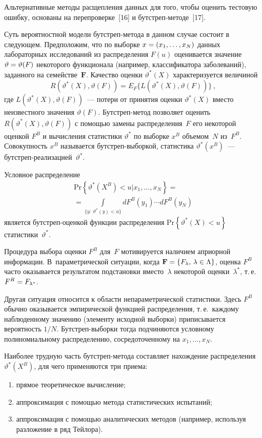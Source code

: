 \begin{multicols}{2}
      Альтернативные методы расщепления данных для того, чтобы оценить тестовую 
ошибку, основаны на перепроверке~[16] и бут\-стреп-ме\-то\-де~[17].
     
     Суть вероятностной модели бутстреп-метода в данном случае состоит в следующем. 
Предположим, что по выборке $x\hm=(x_1,\ldots ,x_N)$ данных лабораторных исследований 
из распределения $F(u)$ оценивается значение $\vartheta\hm=\vartheta(F)$ некоторого 
функционала (например, классификатора заболеваний), заданного на семействе~$\mathbf{F}$. 
Качество оценки $\vartheta^*(X)$ характеризуется величиной
     $$
     R(\vartheta^*(X),\vartheta(F))=E_F\{L(\vartheta^*(X),\vartheta(F))\}\,,
     $$
где $L(\vartheta^*(X),\vartheta(F))$~--- потери от принятия оценки $\vartheta^*(X)$ вместо 
неизвестного значения $\vartheta(F)$. Бут\-стреп-ме\-тод позволяет оценить $ 
R(\vartheta^*(X),\vartheta(F))$ с помощью замены распределения~$F$ его некоторой оценкой 
$F^B$ и вычисления статистики $\vartheta^*$ по выборке $x^B$ объемом~$N$ из~$F^B$. 
Совокупность $x^B$ называется бут\-стреп-вы\-бор\-кой, статистика $\vartheta^*(x^B)$~--- 
бут\-стреп-реа\-ли\-за\-ци\-ей~$\vartheta^*$. 
     
     Условное распределение
     \begin{multline*}
     \mathrm{Pr}\left\{ \vartheta^*\left( X^B\right) <u\vert x_1,\ldots , x_N\right\} = {}\\
     {}=
     \int\limits_{\{y:\ \vartheta^*(y)<u\}} dF^B (y_1)\cdots dF^B(y_N)
     \end{multline*}
является бут\-стреп-оцен\-кой функции распределения $\mathrm{Pr}\left\{ 
\vartheta^*(X)<u\right\}$ статистики~$\vartheta^*$. 
     
     Процедура выбора оценки $F^B$ для~$F$ мотивируется наличием априорной 
информации. В~параметрической ситуации, когда $\mathbf{F}\hm= \left\{ F_\lambda, \, 
\lambda\in \Lambda\right\}$, оценка $F^B$ часто оказывается результатом подстановки 
вместо~$\lambda$ некоторой оценки~$\lambda^*$, т.\,е.\ $F^B\hm=F_{\lambda^*}$. 
{

}

Другая  ситуация относится к области непараметрической статистики. Здесь $F^B$ обычно 
оказывается эмпирической функцией распределения, т.\,е.\ каждому наблюденному значению 
(элементу исходной выборки) приписывается вероятность $1/N$. Бут\-стреп-вы\-бор\-ки тогда 
подчиняются условному полиномиальному распределению, сосредоточенному на  $x_1,\ldots , 
x_N$. 
     
     Наиболее трудную часть бутстреп-метода со\-став\-ля\-ет нахождение распределения 
$\vartheta^*(X^B)$, для чего применяются три приема:
    \begin{enumerate}[(1)]
\item прямое теоретическое вычисление;
\item аппроксимация с помощью метода статистических испытаний;
\item аппроксимация с помощью аналитических методов (например, используя разложение в 
ряд Тейлора).
\end{enumerate}


\end{multicols}
